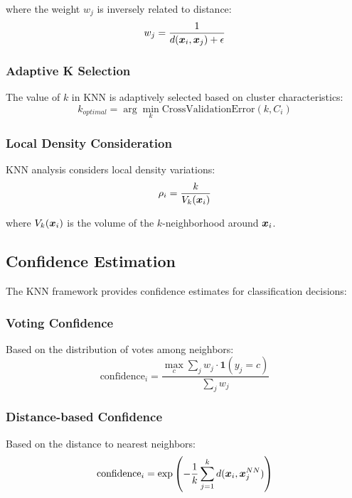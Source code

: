 where the weight $w_j$ is inversely related to distance:
\begin{equation}
w_j = \frac{1}{d(\boldsymbol{x}_i, \boldsymbol{x}_j) + \epsilon}
\end{equation}

\subsubsection{Adaptive K Selection}
The value of $k$ in KNN is adaptively selected based on cluster characteristics:
\begin{equation}
k_{optimal} = \arg\min_{k} \text{CrossValidationError}(k, C_i)
\end{equation}

\subsubsection{Local Density Consideration}
KNN analysis considers local density variations:
\begin{equation}
\rho_i = \frac{k}{V_k(\boldsymbol{x}_i)}
\end{equation}

where $V_k(\boldsymbol{x}_i)$ is the volume of the $k$-neighborhood around $\boldsymbol{x}_i$.

\subsection{Confidence Estimation}
The KNN framework provides confidence estimates for classification decisions:

\subsubsection{Voting Confidence}
Based on the distribution of votes among neighbors:
\begin{equation}
\text{confidence}_i = \frac{\max_c \sum_{j} w_j \cdot \mathbf{1}(y_j = c)}{\sum_{j} w_j}
\end{equation}

\subsubsection{Distance-based Confidence}
Based on the distance to nearest neighbors:
\begin{equation}
\text{confidence}_i = \exp\left(-\frac{1}{k}\sum_{j=1}^{k} d(\boldsymbol{x}_i, \boldsymbol{x}_{j}^{NN})\right)
\end{equation}

